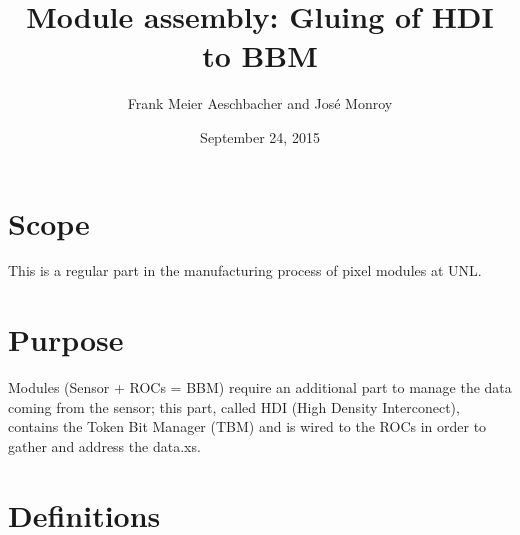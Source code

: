 \documentclass[12pt]{unlsilabsop}
\title{Module assembly: Gluing of HDI to BBM}
\date{September 24, 2015}
\author{Frank Meier Aeschbacher and José Monroy}
\begin{document}
\maketitle

\section{Scope}
This is a regular part in the manufacturing process of pixel modules at UNL.

\section{Purpose}
Modules (Sensor + ROCs = BBM) require an additional part to manage the data coming from the sensor; this part, called HDI (High Density Interconect), contains the Token Bit Manager (TBM) and is wired to the ROCs in order to gather and address the data.xs.   

\section{Definitions}
\end{document}
